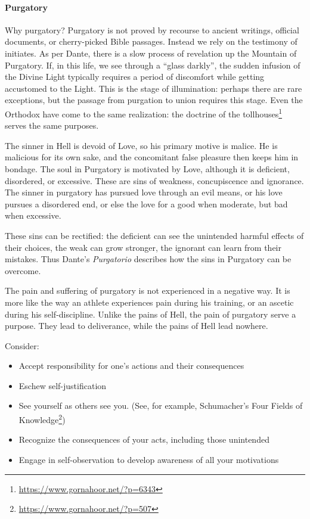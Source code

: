 \paragraph{Purgatory}
Why purgatory? Purgatory is not proved by recourse to ancient writings, official documents, or cherry-picked Bible
passages. Instead we rely on the testimony of initiates. As per Dante, there is a slow process of revelation up the
Mountain of Purgatory. If, in this life, we see through a “glass darkly”, the sudden infusion of the Divine Light
typically requires a period of discomfort while getting accustomed to the Light. This is the stage of illumination:
perhaps there are rare exceptions, but the passage from purgation to union requires this stage. Even the Orthodox have
come to the same realization: the doctrine of the tollhouses\footnote{\url{https://www.gornahoor.net/?p=6343}} serves the same purposes.

The sinner in Hell is devoid of Love, so his primary motive is malice. He is malicious for its own sake, and the
concomitant false pleasure then keeps him in bondage. The soul in Purgatory is motivated by Love, although it is
deficient, disordered, or excessive. These are sins of weakness, concupiscence and ignorance. The sinner in purgatory
has pursued love through an evil means, or his love pursues a disordered end, or else the love for a good when
moderate, but bad when excessive.

These sins can be rectified: the deficient can see the unintended harmful effects of their choices, the weak can grow
stronger, the ignorant can learn from their mistakes. Thus Dante's \emph{Purgatorio} describes how the sins
in Purgatory can be overcome.

The pain and suffering of purgatory is not experienced in a negative way. It is more like the way an athlete experiences
pain during his training, or an ascetic during his self-discipline. Unlike the pains of Hell, the pain of purgatory
serve a purpose. They lead to deliverance, while the pains of Hell lead nowhere.

Consider:

\begin{itemize}
\item Accept responsibility for one's actions and their consequences 
\item Eschew self-justification 
\item See yourself as others see you. (See, for example, Schumacher's Four Fields of Knowledge\footnote{\url{https://www.gornahoor.net/?p=507}}) 
\item Recognize the consequences of your acts, including those unintended 
\item Engage in self-observation to develop awareness of all your motivations 
\end{itemize}

